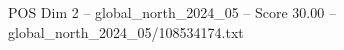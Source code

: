\begin{textsample}{POS Dim 2 – global\_north\_2024\_05 – Score 30.00 – global\_north\_2024\_05/108534174.txt}
\end{textsample}
